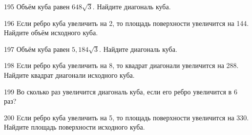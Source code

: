 \begin{taskBN}{195}
Объём куба равен $648\sqrt{3}$. Найдите диагональ куба.
\end{taskBN}

\begin{taskBN}{196}
Eсли ребро куба увеличить на 2, то площадь поверхности увеличится на 144. Найдите объём исходного куба.
\end{taskBN}

\begin{taskBN}{197}
Объём куба равен $5,184\sqrt{3}$. Найдите диагональ куба.
\end{taskBN}

\begin{taskBN}{198}
Eсли ребро куба увеличить на 8, то квадрат диагонали увеличится на 288. Найдите квадрат диагонали исходного куба.
\end{taskBN}

\begin{taskBN}{199}
Во сколько раз увеличится диагональ куба, если его ребро увеличится в 6 раз?
\end{taskBN}

\begin{taskBN}{200}
Eсли ребро куба увеличить на 5, то площадь поверхности увеличится на 330. Найдите площадь поверхности исходного куба.
\end{taskBN}


